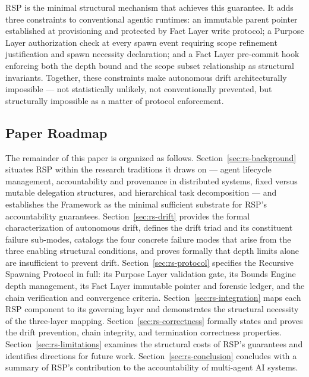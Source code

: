 RSP is the minimal structural mechanism that achieves this guarantee. It adds three constraints to conventional agentic runtimes: an immutable parent pointer established at provisioning and protected by Fact Layer write protocol; a Purpose Layer authorization check at every spawn event requiring scope refinement justification and spawn necessity declaration; and a Fact Layer pre-commit hook enforcing both the depth bound and the scope subset relationship as structural invariants. Together, these constraints make autonomous drift architecturally impossible — not statistically unlikely, not conventionally prevented, but structurally impossible as a matter of protocol enforcement.

\subsection{Paper Roadmap}

The remainder of this paper is organized as follows. Section~\ref{sec:rs-background} situates RSP within the research traditions it draws on — agent lifecycle management, accountability and provenance in distributed systems, fixed versus mutable delegation structures, and hierarchical task decomposition — and establishes the \bxthree{} Framework as the minimal sufficient substrate for RSP's accountability guarantees. Section~\ref{sec:rs-drift} provides the formal characterization of autonomous drift, defines the drift triad and its constituent failure sub-modes, catalogs the four concrete failure modes that arise from the three enabling structural conditions, and proves formally that depth limits alone are insufficient to prevent drift. Section~\ref{sec:rs-protocol} specifies the Recursive Spawning Protocol in full: its Purpose Layer validation gate, its Bounds Engine depth management, its Fact Layer immutable pointer and forensic ledger, and the chain verification and convergence criteria. Section~\ref{sec:rs-integration} maps each RSP component to its governing \bxthree{} layer and demonstrates the structural necessity of the three-layer mapping. Section~\ref{sec:rs-correctness} formally states and proves the drift prevention, chain integrity, and termination correctness properties. Section~\ref{sec:rs-limitations} examines the structural costs of RSP's guarantees and identifies directions for future work. Section~\ref{sec:rs-conclusion} concludes with a summary of RSP's contribution to the accountability of multi-agent AI systems.